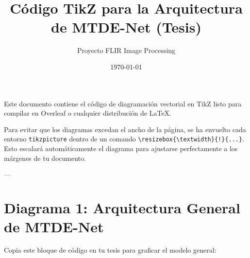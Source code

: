 \documentclass{article}
\title{Código TikZ para la Arquitectura de MTDE-Net (Tesis)}
\author{Proyecto FLIR Image Processing}
\date{\today}
\begin{document}
\maketitle

Este documento contiene el código de diagramación vectorial en TikZ listo para compilar en Overleaf o cualquier distribución de \LaTeX.

Para evitar que los diagramas excedan el ancho de la página, se ha envuelto cada entorno \texttt{tikzpicture} dentro de un comando \texttt{\textbackslash resizebox\{\textbackslash textwidth\}\{!\}\{...\}}. Esto escalará automáticamente el diagrama para ajustarse perfectamente a los márgenes de tu documento.

---

\section{Diagrama 1: Arquitectura General de MTDE-Net}

Copia este bloque de código en tu tesis para graficar el modelo general:
\end{document}
